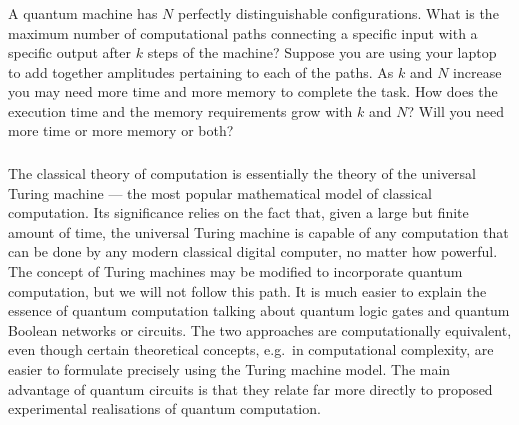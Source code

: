 \documentclass{article}
\begin{document}
\hypertarget{section-4}{%
\subsubsection{}\label{section-4}}

A quantum machine has \(N\) perfectly distinguishable configurations.
What is the maximum number of computational paths connecting a specific input with a specific output after \(k\) steps of the machine?
Suppose you are using your laptop to add together amplitudes pertaining to each of the paths.
As \(k\) and \(N\) increase you may need more time and more memory to complete the task.
How does the execution time and the memory requirements grow with \(k\) and \(N\)?
Will you need more time or more memory or both?

\hypertarget{section-5}{%
\subsubsection{}\label{section-5}}

The classical theory of computation is essentially the theory of the universal Turing machine --- the most popular mathematical model of classical computation.
Its significance relies on the fact that, given a large but finite amount of time, the universal Turing machine is capable of any computation that can be done by any modern classical digital computer, no matter how powerful.
The concept of Turing machines may be modified to incorporate quantum computation, but we will not follow this path.
It is much easier to explain the essence of quantum computation talking about quantum logic gates and quantum Boolean networks or circuits.
The two approaches are computationally equivalent, even though certain theoretical concepts, e.g.~in computational complexity, are easier to formulate precisely using the Turing machine model.
The main advantage of quantum circuits is that they relate far more directly to proposed experimental realisations of quantum computation.

\hypertarget{section-6}{%
\subsubsection{}\label{section-6}}
\end{document}

